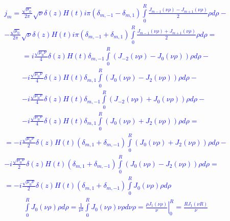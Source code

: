 %
\textcolor{blue} { \begin{equation*} \begin{aligned}
j_m = \frac{\sqrt{\mu_0}}{2\pi} \sqrt{\nu} \delta(z) H(t) 
i\pi ( \delta_{m,-1} - \delta_{m,1} ) \int \limits_{0}^{R} 
\frac{J_{m-1} (\nu \rho) - J_{m+1} (\nu \rho)}{2} \rho d \rho - \\
- \frac{\sqrt{\mu_0}}{2\pi} \sqrt{\nu} \delta(z) H(t) 
i\pi ( \delta_{m,-1} + \delta_{m,1} ) \int \limits_{0}^{R} 
\frac{J_{m-1} (\nu \rho) + J_{m+1} (\nu \rho)}{2} \rho d \rho =
\end{aligned} \end{equation*} }
%
\textcolor{blue} { \begin{equation*} \begin{aligned}
= i \frac{\sqrt{\mu_0 \nu}}{4} \delta(z) H(t)
\delta_{m,-1} \int \limits_{0}^{R} \left( J_{-2} (\nu \rho) - 
J_0 (\nu \rho) \right) \rho d \rho - \\
- i \frac{\sqrt{\mu_0 \nu}}{4} \delta(z) H(t)
\delta_{m,1} \int \limits_{0}^{R} \left( J_{0} (\nu \rho) - 
J_2 (\nu \rho) \right) \rho d \rho - \\
- i \frac{\sqrt{\mu_0 \nu}}{4} \delta(z) H(t)
\delta_{m,-1} \int \limits_{0}^{R} \left( J_{-2} (\nu \rho) +  
J_0 (\nu \rho) \right) \rho d \rho - \\
- i \frac{\sqrt{\mu_0 \nu}}{4} \delta(z) H(t)
\delta_{m,1} \int \limits_{0}^{R} \left( J_{0} (\nu \rho) +
J_2 (\nu \rho) \right) \rho d \rho =
\end{aligned} \end{equation*} }
%
\textcolor{blue} { \begin{equation*} \begin{aligned}
= - i \frac{\sqrt{\mu_0 \nu}}{2} \delta(z) H(t) 
(\delta_{m,1} + \delta_{m,-1}) 
\int \limits_{0}^{R} \left( J_{0} (\nu \rho) + 
J_2 (\nu \rho) \right) \rho d \rho - \\
- i \frac{\sqrt{\mu_0 \nu}}{2} \delta(z) H(t) 
(\delta_{m,1} + \delta_{m,-1}) 
\int \limits_{0}^{R} \left( J_{0} (\nu \rho) -
J_2 (\nu \rho) \right) \rho d \rho = \\
= - i \frac{\sqrt{\mu_0 \nu}}{2} \delta(z) H(t) 
(\delta_{m,1} + \delta_{m,-1}) 
\int \limits_{0}^{R} J_{0} (\nu \rho) \rho d \rho
\end{aligned} \end{equation*} }
%
\textcolor{blue} { \begin{equation*} \begin{aligned}
\int \limits_{0}^{R} J_{0} (\nu \rho) \rho d \rho = 
\frac{1}{\nu^2} \int \limits_{0}^{R} J_{0} (\nu \rho) \nu \rho d \nu \rho =
\left. \frac{\rho J_1 (\nu \rho) }{\nu} \right|_{0}^{R} = 
\frac{R J_1 (\nu R)}{\nu}
\end{aligned} \end{equation*} }
